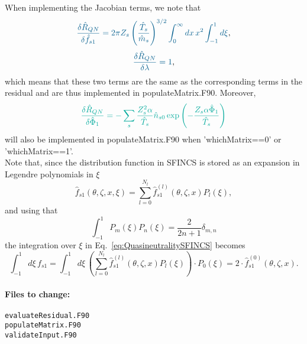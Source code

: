 \documentclass[12pt]{article}
\begin{document}
\noindent When implementing the Jacobian terms, we note that 
\begin{equation}
  \label{eq:QNJacobianf1}
\textcolor{MidnightBlue}{
  \frac{\delta \hat{R}_{QN}}{\delta \hat{f}_{s 1}} = 2\pi Z_s \left(\frac{\hat{T}_s}{\hat{m}_s}\right)^{3/2} \int_0^{\infty} dx \, x^2 \int_{-1}^1 d\xi},
\end{equation}
\begin{equation}
  \label{eq:QNJacobianLambda}
\textcolor{MidnightBlue}{
  \frac{\delta \hat{R}_{QN}}{\delta \lambda} = 1},
\end{equation}
which means that these two terms are the same as the corresponding terms in the residual and are thus implemented in populateMatrix.F90.
Moreover,
\begin{equation}
  \label{eq:QNJacobianPhi1}
\textcolor{JungleGreen}{
  \frac{\delta \hat{R}_{QN}}{\delta \hat{\Phi}_1} = -
\sum_s  \frac{Z_s^2 \alpha}{\hat{T}_s} \hat{n}_{s0} \exp \left(- \frac{Z_s \alpha \hat{\Phi}_1}{\hat{T}_s}  \right)}
\end{equation}
will also be implemented in populateMatrix.F90 when 'whichMatrix==0' or 'whichMatrix==1'. 
\\

\noindent Note that, since the distribution function in SFINCS is stored as an expansion in Legendre polynomials in $\xi$
\[
\hat{f}_{s 1}\left(\theta, \zeta, x, \xi\right) = \sum_{l=0}^{N_l} \hat{f}_{s 1}^{\left(l\right)}\left(\theta, \zeta, x\right) P_l \left(\xi\right),
\]
and using that
\[
\int_{-1}^1 P_m\left(\xi\right) P_n\left(\xi\right) = \frac{2}{2n + 1} \delta_{m,n}
\]
the integration over $\xi$ in Eq.~\ref{eq:QuasineutralitySFINCS} becomes
\begin{equation}
  \label{eq:xiIntegration}
  \int_{-1}^1 d\xi \, f_{s 1} = \int_{-1}^1 d\xi \, \left(\sum_{l=0}^{N_l} \hat{f}_{s 1}^{\left(l\right)}\left(\theta, \zeta, x\right) P_l \left(\xi\right)\right) \cdot P_0 \left(\xi\right) = 2 \cdot  \hat{f}_{s 1}^{\left(0\right)}\left(\theta, \zeta, x\right).
\end{equation}

\paragraph*{\textbf{Files to change:}}
\begin{verbatim}
evaluateResidual.F90
populateMatrix.F90
validateInput.F90
\end{verbatim}
\end{document}
